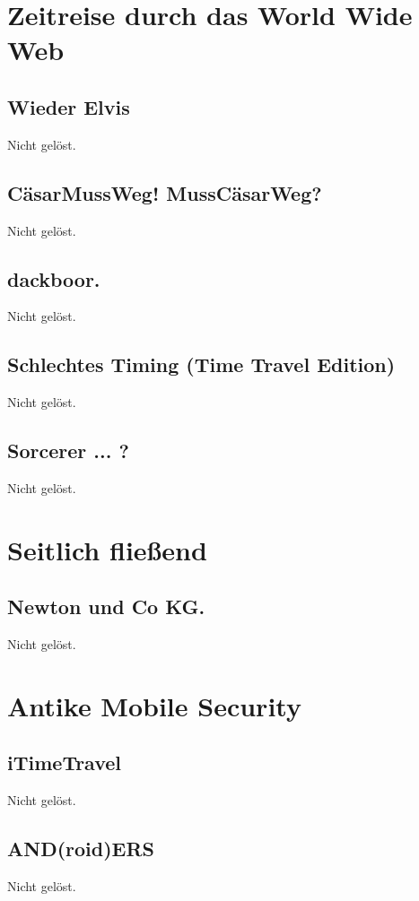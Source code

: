 \documentclass[12pt,a4paper,titlepage,oneside]{scrartcl}
\begin{document}
\section{Zeitreise durch das World Wide Web}

\subsection{Wieder Elvis}
Nicht gelöst.

\subsection{C\"asarMussWeg! MussC\"asarWeg?}
Nicht gelöst.

\subsection{dackboor.}
Nicht gelöst.

\subsection{Schlechtes Timing (Time Travel Edition)}
Nicht gelöst.

\subsection{Sorcerer ... ?}
Nicht gelöst.


\section{Seitlich fließend}

\subsection{Newton und Co KG.}
Nicht gelöst.


\section{Antike Mobile Security}

\subsection{iTimeTravel}
Nicht gelöst.

\subsection{AND(roid)ERS}
Nicht gelöst.
\end{document}
